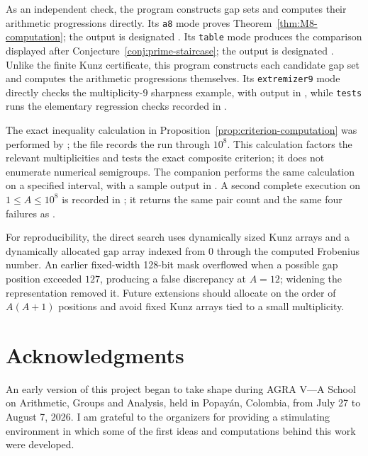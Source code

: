 \documentclass[11pt]{article}
\theoremstyle{plain}
\theoremstyle{definition}
\theoremstyle{remark}
\begin{document}
As an independent check, the program 
constructs gap sets and computes their arithmetic progressions directly.
Its \texttt{a8} mode proves Theorem~\ref{thm:M8-computation}; the output is
designated .  Its \texttt{table} mode produces the
comparison displayed after Conjecture~\ref{conj:prime-staircase}; the output
is designated .  Unlike the finite Kunz
certificate, this program constructs each candidate gap set and computes the
arithmetic progressions themselves.  Its \texttt{extremizer9} mode directly
checks the multiplicity-$9$ sharpness example, with output in
, while \texttt{tests} runs the elementary
regression checks recorded in .

The exact inequality calculation in
Proposition~\ref{prop:criterion-computation} was performed by
; the file
 records the run through $10^8$.  This
calculation factors the relevant multiplicities and tests the exact composite
criterion; it does not enumerate numerical semigroups.  The
companion  performs the same calculation on a
specified interval, with a sample output in .
A second complete execution on $1\leq A\leq10^8$ is recorded in
; it returns the same pair count and the same
four failures as .

For reproducibility, the direct search uses dynamically sized Kunz arrays and
a dynamically allocated gap array indexed from $0$ through the computed
Frobenius number.
An earlier fixed-width 128-bit mask overflowed when a possible gap position
exceeded $127$, producing a false discrepancy at $A=12$; widening the
representation removed it.  Future extensions should allocate on the order
of $A(A+1)$ positions and avoid fixed Kunz arrays tied to a small
multiplicity.


\section*{Acknowledgments}

An early version of this project began to take shape during AGRA V---A School on
Arithmetic, Groups and Analysis, held in Popayán, Colombia, from July 27 to
August 7, 2026.  I am grateful to the organizers for providing a stimulating
environment in which some of the first ideas and computations behind this work
were developed.
\end{document}
